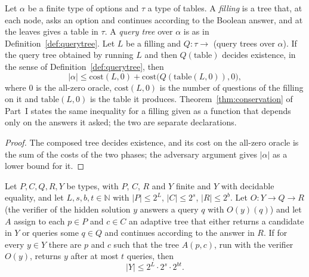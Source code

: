 \begin{theorem}
  \label{thm:arrow-work-conserved}
  \leanok
  Let $\alpha$ be a finite type of options and $\tau$ a type of tables. A \emph{filling} is a tree
  that, at each node, asks an option and continues according to the Boolean answer, and at the leaves
  gives a table in $\tau$. A \emph{query tree} over $\alpha$ is as in Definition~\ref{def:querytree}.
  Let $L$ be a filling and $Q : \tau \to$ (query trees over $\alpha$). If the query tree obtained by
  running $L$ and then $Q(\text{table})$ decides existence, in the sense of
  Definition~\ref{def:querytree}, then
  \[
    |\alpha| \le \mathrm{cost}(L, 0) + \mathrm{cost}\bigl(Q(\mathrm{table}(L, 0)), 0\bigr),
  \]
  where $0$ is the all-zero oracle, $\mathrm{cost}(L, 0)$ is the number of questions of the filling on
  it and $\mathrm{table}(L, 0)$ is the table it produces. Theorem~\ref{thm:conservation} of Part~I
  states the same inequality for a filling given as a function that depends only on the answers it
  asked; the two are separate declarations.
  \own{}
\end{theorem}

\begin{proof}
  \leanok
  The composed tree decides existence, and its cost on the all-zero oracle is the sum of the costs
  of the two phases; the adversary argument gives $|\alpha|$ as a lower bound for it.
\end{proof}

\begin{theorem}
  \label{thm:arrow-three-memories}
  \leanok
  Let $P, C, Q, R, Y$ be types, with $P$, $C$, $R$ and $Y$ finite and $Y$ with decidable equality,
  and let $L, s, b, t \in \mathbb{N}$ with $|P| \le 2^L$, $|C| \le 2^s$, $|R| \le 2^b$. Let $O : Y
  \to Q \to R$ (the verifier of the hidden solution $y$ answers a query $q$ with $O(y)(q)$) and let
  $A$ assign to each $p \in P$ and $c \in C$ an adaptive tree that either returns a candidate in $Y$
  or queries some $q \in Q$ and continues according to the answer in $R$. If for every $y \in Y$
  there are $p$ and $c$ such that the tree $A(p, c)$, run with the verifier $O(y)$, returns $y$ after
  at most $t$ queries, then
  \[
    |Y| \le 2^L \cdot 2^s \cdot 2^{bt}.
  \]
  \own{}
\end{theorem}

